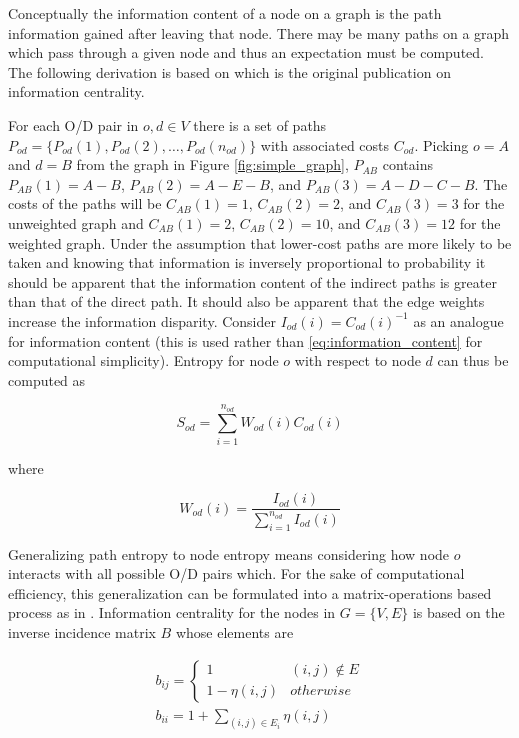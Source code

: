 Conceptually the information content of a node on a graph is the path information gained after leaving that node. There may be many paths on a graph which pass through a given node and thus an expectation must be computed. The following derivation is based on \cite{Stephenson_1989} which is the original publication on information centrality.

For each O/D pair in $o,d \in V$ there is a set of paths $P_{od} = \{P_{od}(1),P_{od}(2), \dots, P_{od}(n_{od})\}$ with associated costs $C_{od}$. Picking $o=A$ and $d=B$ from the graph in Figure \ref{fig:simple_graph}, $P_{AB}$ contains $P_{AB}(1) = A - B$, $P_{AB}(2) = A - E - B$, and $P_{AB}(3) = A - D - C - B$. The costs of the paths will be $C_{AB}(1) = 1$, $C_{AB}(2) = 2$, and $C_{AB}(3) = 3$ for the unweighted graph and $C_{AB}(1) = 2$, $C_{AB}(2) = 10$, and $C_{AB}(3) = 12$ for the weighted graph. Under the assumption that lower-cost paths are more likely to be taken and knowing that information is inversely proportional to probability it should be apparent that the information content of the indirect paths is greater than that of the direct path. It should also be apparent that the edge weights increase the information disparity. Consider $I_{od}(i) = C_{od}(i)^{-1}$ as an analogue for information content (this is used rather than \eqref{eq:information_content} for computational simplicity). Entropy for node $o$ with respect to node $d$ can thus be computed as

\begin{equation}
	S_{od} = \sum_{i = 1}^{n_{od}}W_{od}(i)C_{od}(i)
\end{equation}

where

\begin{equation}
	W_{od}(i) = \frac{I_{od}(i)}{\sum_{i = 1}^{n_{od}} I_{od}(i)}
\end{equation}

Generalizing path entropy to node entropy means considering how node $o$ interacts with all possible O/D pairs which. For the sake of computational efficiency, this generalization can be formulated into a matrix-operations based process as in \cite{Stephenson_1989}. Information centrality for the nodes in $G = \{V, E\}$ is based on the inverse incidence matrix $B$ whose elements are

\begin{align}
	b_{ij} = \begin{cases}
		1 & (i, j) \not\in E \\
		1 - \eta(i, j) & otherwise
	\end{cases}\\
	b_{ii} = 1 + \sum_{(i, j) \in E_i} \eta(i, j)
\end{align}

